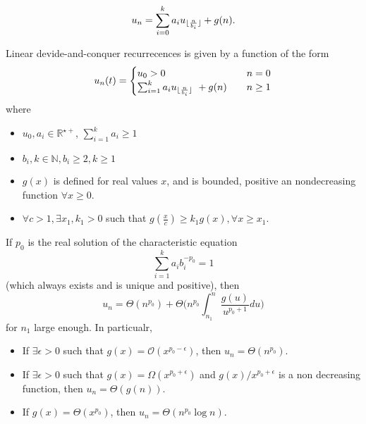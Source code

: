 	\begin{equation}
		\label{eq:linearDevideAndConquerRecurrence}
		 u_n = \sum_{i=0}^k a_i u _{\lfloor\frac{n}{b_i}\rfloor} + g(n).
	\end{equation}
 
	Linear devide-and-conquer recurrecences is given by a function of the form
	\begin{equation}
	 u_n(t) = 
	 	\begin{cases}
				u_0 > 0 & n= 0 \\
				\sum_{i=1}^k a_i u_{\lfloor\frac{n}{b_i}\rfloor} \ + g(n) \quad &n  \geq 1 
		\end{cases}
	 \end{equation}
	 where
	 \begin{itemize}
		 \item $u_0, a_i \in \mathbb{R}^{\star+}$, $\sum_{i=1}^k a_i \geq 1$
		 \item $b_{i}, k \in \mathbb{N}, b_i \geq 2, k\geq 1$
		 \item $g(x)$ is defined for real values $x$, and is bounded, positive an nondecreasing function $\forall x\geq 0$.
	 	\item $\forall c > 1, \exists x_1, k_1 >0$ such that $g(\frac{x}{c}) \geq k_1 g(x), \forall x \geq x_1$. 
	 \end{itemize}
 
 \begin{theorem}
 	\label{thm:AkraAndBazzi}
	 If $p_0$ is the real solution of the characteristic equation
	 \begin{equation}
	 \label{eq:characteristicequation}
	 \sum_{i=1}^k a_i b_i ^{-p_0} = 1
	 \end{equation}
	 (which always exists and is unique and positive), then 
	 \begin{equation}
		 u_n = \Theta(n^{p_0}) + \Theta \Big( n^{p_0} \int_{n_1}^n \frac{g(u)}{u^{p_0+1}}  du \Big)
	 \end{equation}
	 for $n_1$ large enough. In particualr,
	 \begin{itemize}
	 	\item If $\exists \epsilon >0$ such that $g(x)=\mathcal{O}(x^{p_0-\epsilon})$, then $u_n = \Theta (n^{p_0})$.
	 	\item If $\exists \epsilon > 0$ such that $g(x) = \Omega(x^{p_0 + \epsilon})$ and $g(x)/ x^{p_0+\epsilon}$ is a non decreasing function, then $u_n = \Theta(g(n))$.
	 	\item If $g(x) = \Theta(x^{p_0})$, then $u_{n} = \Theta(n^{p_0} \log n)$. 
	 	\end{itemize}
	\end{theorem}
 
